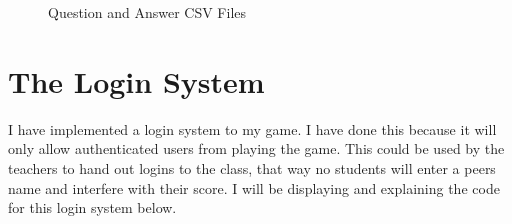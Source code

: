 \documentclass[12pt]{report}
\begin{document}
 \begin{figure}[H]
    \caption{Question and Answer CSV Files}
\end{figure}

\section{The Login System}
I have implemented a login system to my game. I have done this because it will only allow authenticated users from playing the game. This could be used by the teachers to hand out logins to the class, that way no students will enter a peers name and interfere with their score. I will be displaying and explaining the code for this login system below.

\scriptsize
\end{document}
